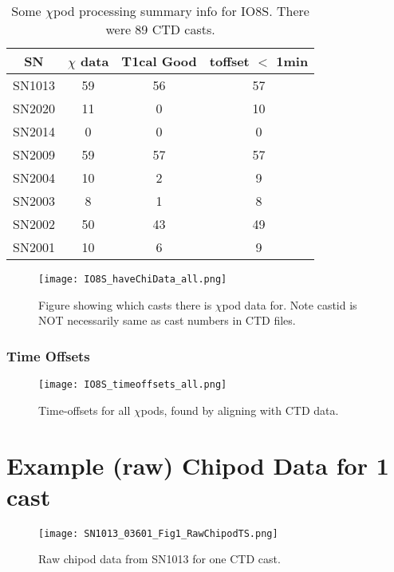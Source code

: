 \documentclass[11pt]{article}
\begin{document}
\begin{table}[htdp]
\caption{Some $\chi$pod processing summary info for IO8S. There were 89 CTD casts.}
\begin{center}
\begin{tabular}{|c|c|c|c|}
\hline
SN & $\chi$ data & T1cal Good & toffset $<$ 1min \\ 
\hline
\hline
SN1013 & 59 & 56 & 57 \\ 
SN2020 & 11 & 0 & 10 \\ 
SN2014 & 0 & 0 & 0 \\ 
SN2009 & 59 & 57 & 57 \\ 
SN2004 & 10 & 2 & 9 \\ 
SN2003 & 8 & 1 & 8 \\ 
SN2002 & 50 & 43 & 49 \\ 
SN2001 & 10 & 6 & 9 \\ 
\hline
\end{tabular}
\end{center}
\label{procinfo}
\end{table}


\begin{figure}[htbp]
\texttt{[image: IO8S\_haveChiData\_all.png]}
\caption{Figure showing which casts there is $\chi$pod data for. Note castid is NOT necessarily same as cast numbers in CTD files.}
\label{ischidata}
\end{figure}


\subsubsection{Time Offsets}


\begin{figure}[htbp]
\texttt{[image: IO8S\_timeoffsets\_all.png]}
\caption{Time-offsets for all $\chi$pods, found by aligning with CTD data.}
\label{toffs}
\end{figure}


\section{Example (raw) Chipod Data for 1 cast}

\begin{figure}[htbp]
\texttt{[image: SN1013\_03601\_Fig1\_RawChipodTS.png]}
\caption{Raw chipod data from SN1013 for one CTD cast.}
\label{sn1013_1}
\end{figure}
\end{document}
